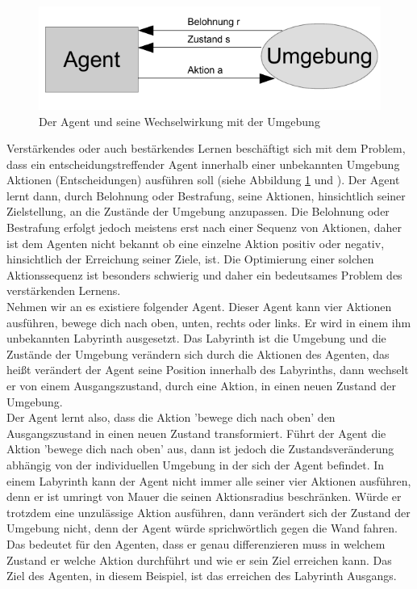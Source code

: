 \begin{figure}[!htbp]
  \centering
  \includegraphics[scale = 1.4]{inhalt/abbildungen/agent_umgebung.pdf}
  \caption{Der Agent und seine Wechselwirkung mit der Umgebung}
  \label{fig:agent_umgebung}
\end{figure} 

Verstärkendes oder auch bestärkendes Lernen beschäftigt sich mit dem Problem, dass ein entscheidungstreffender Agent innerhalb einer unbekannten Umgebung Aktionen (Entscheidungen) ausführen soll (siehe Abbildung \ref{fig:agent_umgebung} \cite[\acs{vgl.} 398]{Alpaydin} und \cite[\acs{vgl.} 290]{Ertel}). Der Agent lernt dann, durch Belohnung oder Bestrafung, seine Aktionen, hinsichtlich seiner Zielstellung, an die Zustände der Umgebung anzupassen. Die Belohnung oder Bestrafung erfolgt jedoch meistens erst nach einer Sequenz von Aktionen, daher ist dem Agenten nicht bekannt ob eine einzelne Aktion positiv oder negativ, hinsichtlich der Erreichung seiner Ziele, ist. Die Optimierung einer solchen Aktionssequenz ist besonders schwierig und daher ein bedeutsames Problem des verstärkenden Lernens.\\

Nehmen wir an es existiere folgender Agent. Dieser Agent kann vier Aktionen ausführen, bewege dich nach oben, unten, rechts oder links. Er wird in einem ihm unbekannten Labyrinth ausgesetzt. Das Labyrinth ist die Umgebung und die Zustände der Umgebung verändern sich durch die Aktionen des Agenten, das heißt verändert der Agent seine Position innerhalb des Labyrinths, dann wechselt er von einem Ausgangszustand, durch eine Aktion, in einen neuen Zustand der Umgebung. \\

Der Agent lernt also, dass die Aktion 'bewege dich nach oben' den Ausgangszustand in einen neuen Zustand transformiert. Führt der Agent die Aktion 'bewege dich nach oben' aus, dann ist jedoch die Zustandsveränderung abhängig von der individuellen Umgebung in der sich der Agent befindet. In einem Labyrinth kann der Agent nicht immer alle seiner vier Aktionen ausführen, denn er ist umringt von Mauer die seinen Aktionsradius beschränken. Würde er trotzdem eine unzulässige Aktion ausführen, dann verändert sich der Zustand der Umgebung nicht, denn der Agent würde sprichwörtlich gegen die Wand fahren. Das bedeutet für den Agenten, dass er genau differenzieren muss in welchem Zustand er welche Aktion durchführt und wie er sein Ziel erreichen kann. Das Ziel des Agenten, in diesem Beispiel, ist das erreichen des Labyrinth Ausgangs. \\

